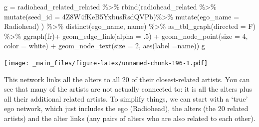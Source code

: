 \documentclass[
]{book}
\newenvironment{Shaded}{\begin{snugshade}}{\end{snugshade}}
\newcommand{\AttributeTok}[1]{\textcolor[rgb]{0.77,0.63,0.00}{#1}}
\newcommand{\DecValTok}[1]{\textcolor[rgb]{0.00,0.00,0.81}{#1}}
\newcommand{\FunctionTok}[1]{\textcolor[rgb]{0.00,0.00,0.00}{#1}}
\newcommand{\NormalTok}[1]{#1}
\newcommand{\OtherTok}[1]{\textcolor[rgb]{0.56,0.35,0.01}{#1}}
\newcommand{\SpecialCharTok}[1]{\textcolor[rgb]{0.00,0.00,0.00}{#1}}
\newcommand{\StringTok}[1]{\textcolor[rgb]{0.31,0.60,0.02}{#1}}
\begin{document}
\begin{Shaded}
\begin{Highlighting}[]
\NormalTok{g }\OtherTok{=}\NormalTok{ radiohead\_related\_related   }\SpecialCharTok{\%\textgreater{}\%} 
  \FunctionTok{rbind}\NormalTok{(radiohead\_related }\SpecialCharTok{\%\textgreater{}\%} 
  \FunctionTok{mutate}\NormalTok{(}\AttributeTok{seed\_id =} \StringTok{\textquotesingle{}4Z8W4fKeB5YxbusRsdQVPb\textquotesingle{}}\NormalTok{)}\SpecialCharTok{\%\textgreater{}\%} 
  \FunctionTok{mutate}\NormalTok{(}\AttributeTok{ego\_name =} \StringTok{\textquotesingle{}Radiohead\textquotesingle{}}\NormalTok{) ) }\SpecialCharTok{\%\textgreater{}\%} 
  \FunctionTok{distinct}\NormalTok{(ego\_name, name) }\SpecialCharTok{\%\textgreater{}\%} 
  \FunctionTok{as\_tbl\_graph}\NormalTok{(}\AttributeTok{directed =}\NormalTok{ F) }\SpecialCharTok{\%\textgreater{}\%} 
  \FunctionTok{ggraph}\NormalTok{(}\StringTok{\textquotesingle{}fr\textquotesingle{}}\NormalTok{)}\SpecialCharTok{+} \FunctionTok{geom\_edge\_link}\NormalTok{(}\AttributeTok{alpha =}\NormalTok{ .}\DecValTok{5}\NormalTok{) }\SpecialCharTok{+} 
  \FunctionTok{geom\_node\_point}\NormalTok{(}\AttributeTok{size =} \DecValTok{4}\NormalTok{, }\AttributeTok{color =} \StringTok{\textquotesingle{}white\textquotesingle{}}\NormalTok{) }\SpecialCharTok{+} 
  \FunctionTok{geom\_node\_text}\NormalTok{(}\AttributeTok{size =} \DecValTok{2}\NormalTok{, }\FunctionTok{aes}\NormalTok{(}\AttributeTok{label =}\NormalTok{name))}
\NormalTok{g}
\end{Highlighting}
\end{Shaded}

\texttt{[image: \_main\_files/figure-latex/unnamed-chunk-196-1.pdf]}

This network links all the alters to all 20 of their closest-related artists. You can see that many of the artists are not actually connected to: it is all the alters plus all their additional related artists. To simplify things, we can start with a `true' ego network, which just includes the ego (Radiohead), the alters (the 20 related artists) and the alter links (any pairs of alters who are also related to each other).
\end{document}
